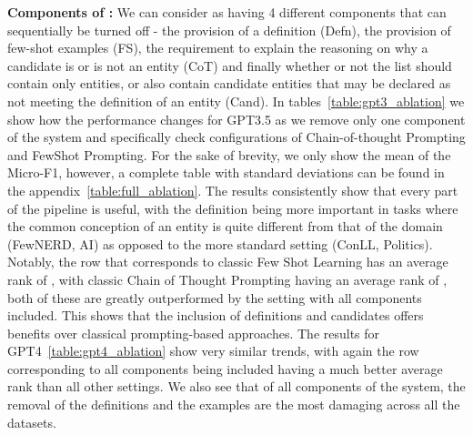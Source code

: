 \documentclass[11pt]{article}
\begin{document}
\noindent\textbf{Components of \toolname:} We can consider \toolname as having 4 different components that can sequentially be turned off - the provision of a definition (Defn), the provision of few-shot examples (FS), the requirement to explain the reasoning on why a candidate is or is not an entity (CoT) and finally whether or not the list should contain only entities, or also contain candidate entities that may be declared as not meeting the definition of an entity (Cand). In tables~\ref{table:gpt3_ablation} we show how the performance changes for GPT3.5 as we remove only one component of the system and specifically check configurations of Chain-of-thought Prompting and FewShot Prompting. For the sake of brevity, we only show the mean of the Micro-F1, however, a complete table with standard deviations can be found in the appendix~\ref{table:full_ablation}. The results consistently show that every part of the pipeline is useful, with the definition being more important in tasks where the common conception of an entity is quite different from that of the domain (FewNERD, AI) as opposed to the more standard setting (ConLL, Politics). Notably, the row that corresponds to classic Few Shot Learning has an average rank of , with classic Chain of Thought Prompting having an average rank of , both of these are greatly outperformed by the setting with all components included. This shows that the inclusion of definitions and candidates offers benefits over classical prompting-based approaches. 
The results for GPT4~\ref{table:gpt4_ablation} show very similar trends, with again the row corresponding to all components being included having a much better average rank than all other settings. We also see that of all components of the system, the removal of the definitions and the examples are the most damaging across all the datasets.  
\end{document}
